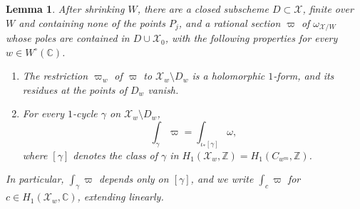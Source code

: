 \documentclass[11pt]{amsart}
\newtheorem{lemma}[theorem]{Lemma}
\theoremstyle{definition}
\theoremstyle{remark}
\numberwithin{equation}{section}
\newcommand{\Z}{\mathbb{Z}}
\newcommand{\C}{\mathbb{C}}
\newcommand{\cX}{\mathcal{X}}
\begin{document}
\begin{lemma}\label{lem:eta}
After shrinking $W$, there are a closed subscheme $D\subset\cX$, finite over $W$ and containing none of the points $P_j$, and a rational section $\varpi$ of $\omega_{\cX/W}$ whose poles are contained in $D\cup\cX_0$, with the following properties for every $w\in W^\circ(\C)$.
\begin{enumerate}[label=\textup{(\roman*)},leftmargin=2em]
\item The restriction $\varpi_w$ of $\varpi$ to $\cX_w\setminus D_w$ is a holomorphic $1$-form, and its residues at the points of $D_w$ vanish.
\item For every $1$-cycle $\gamma$ on $\cX_w\setminus D_w$,
\[
\int_\gamma\varpi=\int_{\iota_*[\gamma]}\omega ,
\]
where $[\gamma]$ denotes the class of $\gamma$ in $H_1(\cX_w,\Z)=H_1(C_{w^m},\Z)$.
\end{enumerate}
In particular, $\int_\gamma\varpi$ depends only on $[\gamma]$, and we write $\int_c\varpi$ for $c\in H_1(\cX_w,\C)$, extending linearly.
\end{lemma}
\end{document}
